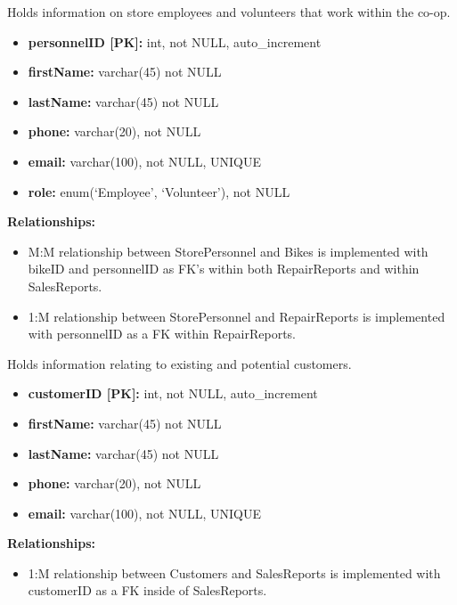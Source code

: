 \documentclass{article}
\begin{document}
\vspace{0.5cm}

\begin{tcolorbox}[colback=secondarycolor, colframe=primarycolor, title=\textbf{StorePersonnel Table}]
Holds information on store employees and volunteers that work within the co-op.
\vspace{0.2cm}

\begin{itemize}
  \item \textbf{personnelID [PK]:} int, not NULL, auto\_increment
  \item \textbf{firstName:} varchar(45) not NULL
  \item \textbf{lastName:} varchar(45) not NULL
  \item \textbf{phone:} varchar(20), not NULL
  \item \textbf{email:} varchar(100), not NULL, UNIQUE
  \item \textbf{role:} enum(`Employee', `Volunteer'), not NULL
\end{itemize}
\vspace{0.2cm}

\textbf{Relationships:}
\vspace{0.2cm}
\begin{itemize}
  \item M:M relationship between StorePersonnel and Bikes is implemented with bikeID and personnelID as FK's within both RepairReports and within SalesReports.
  \item 1:M relationship between StorePersonnel and RepairReports is implemented with personnelID as a FK within RepairReports.
\end{itemize}
\end{tcolorbox}

\vspace{0.5cm}

\begin{tcolorbox}[colback=secondarycolor, colframe=primarycolor, title=\textbf{Customers Table}]
Holds information relating to existing and potential customers.
\vspace{0.2cm}

\begin{itemize}
  \item \textbf{customerID [PK]:} int, not NULL, auto\_increment
  \item \textbf{firstName:} varchar(45) not NULL
  \item \textbf{lastName:} varchar(45) not NULL
  \item \textbf{phone:} varchar(20), not NULL
  \item \textbf{email:} varchar(100), not NULL, UNIQUE
\end{itemize}
\vspace{0.2cm}

\textbf{Relationships:}
\vspace{0.2cm}
\begin{itemize}
  \item 1:M relationship between Customers and SalesReports is implemented with customerID as a FK inside of SalesReports.
\end{itemize}
\end{tcolorbox}
\end{document}
